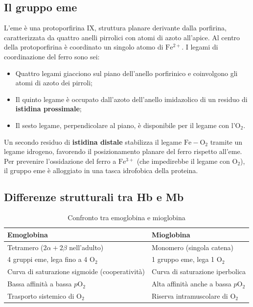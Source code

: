 \documentclass[12pt,a4paper]{report}
\begin{document}
\subsection{Il gruppo eme}
L'eme è una protoporfirina IX, struttura planare derivante dalla porfirina, caratterizzata da quattro anelli pirrolici con atomi di azoto all'apice. Al centro della protoporfirina è coordinato un singolo atomo di \(\mathrm{Fe^{2+}}\).
I legami di coordinazione del ferro sono sei:
\begin{itemize}
\item Quattro legami giacciono sul piano dell'anello porfirinico e coinvolgono gli atomi di azoto dei pirroli;
\item Il quinto legame è occupato dall'azoto dell'anello imidazolico di un residuo di \textbf{istidina prossimale};
\item Il sesto legame, perpendicolare al piano, è disponibile per il legame con l'\(\mathrm{O_2}\).
\end{itemize}
Un secondo residuo di \textbf{istidina distale} stabilizza il legame \(\mathrm{Fe-O_2}\) tramite un legame idrogeno, favorendo il posizionamento planare del ferro rispetto all'eme. Per prevenire l'ossidazione del ferro a \(\mathrm{Fe^{3+}}\) (che impedirebbe il legame con \(\mathrm{O_2}\)), il gruppo eme è alloggiato in una tasca idrofobica della proteina.

\subsection{Differenze strutturali tra Hb e Mb}
\begin{table}[htbp]
\centering
\caption{Confronto tra emoglobina e mioglobina}
\label{tab:hb-mb}
\renewcommand{\arraystretch}{1.2}
\begin{tabular}{@{} p{} p{} @{}}
\toprule
\textbf{Emoglobina} & \textbf{Mioglobina} \\
\midrule
Tetramero (\(2\alpha + 2\beta\) nell'adulto) & Monomero (singola catena) \\
4 gruppi eme, lega fino a 4 \(\mathrm{O_2}\) & 1 gruppo eme, lega 1 \(\mathrm{O_2}\) \\
Curva di saturazione sigmoide (cooperatività) & Curva di saturazione iperbolica \\
Bassa affinità a bassa \(p\mathrm{O_2}\) & Alta affinità anche a bassa \(p\mathrm{O_2}\) \\
Trasporto sistemico di \(\mathrm{O_2}\) & Riserva intramuscolare di \(\mathrm{O_2}\) \\
\bottomrule
\end{tabular}
\end{table}
\end{document}
